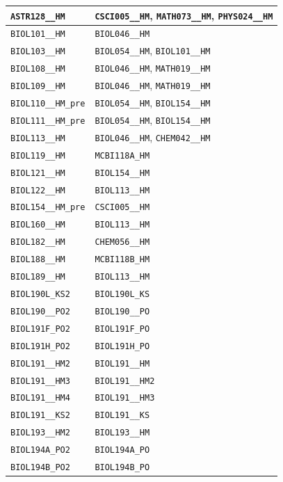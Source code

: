 \begin{longtable}{|p{4.4in}|p{4.4in}|}
    \verb|ASTR128__HM| & \verb|CSCI005__HM|, \verb|MATH073__HM|, \verb|PHYS024__HM|\\\hline
    \verb|BIOL101__HM| & \verb|BIOL046__HM|\\\hline
    \verb|BIOL103__HM| & \verb|BIOL054__HM|, \verb|BIOL101__HM|\\\hline
    \verb|BIOL108__HM| & \verb|BIOL046__HM|, \verb|MATH019__HM|\\\hline
    \verb|BIOL109__HM| & \verb|BIOL046__HM|, \verb|MATH019__HM|\\\hline
    \verb|BIOL110__HM_pre| & \verb|BIOL054__HM|, \verb|BIOL154__HM|\\\hline
    \verb|BIOL111__HM_pre| & \verb|BIOL054__HM|, \verb|BIOL154__HM|\\\hline
    \verb|BIOL113__HM| & \verb|BIOL046__HM|, \verb|CHEM042__HM|\\\hline
    \verb|BIOL119__HM| & \verb|MCBI118A_HM|\\\hline
    \verb|BIOL121__HM| & \verb|BIOL154__HM|\\\hline
    \verb|BIOL122__HM| & \verb|BIOL113__HM|\\\hline
    \verb|BIOL154__HM_pre| & \verb|CSCI005__HM|\\\hline
    \verb|BIOL160__HM| & \verb|BIOL113__HM|\\\hline
    \verb|BIOL182__HM| & \verb|CHEM056__HM|\\\hline
    \verb|BIOL188__HM| & \verb|MCBI118B_HM|\\\hline
    \verb|BIOL189__HM| & \verb|BIOL113__HM|\\\hline
    \verb|BIOL190L_KS2| & \verb|BIOL190L_KS|\\\hline
    \verb|BIOL190__PO2| & \verb|BIOL190__PO|\\\hline
    \verb|BIOL191F_PO2| & \verb|BIOL191F_PO|\\\hline
    \verb|BIOL191H_PO2| & \verb|BIOL191H_PO|\\\hline
    \verb|BIOL191__HM2| & \verb|BIOL191__HM|\\\hline
    \verb|BIOL191__HM3| & \verb|BIOL191__HM2|\\\hline
    \verb|BIOL191__HM4| & \verb|BIOL191__HM3|\\\hline
    \verb|BIOL191__KS2| & \verb|BIOL191__KS|\\\hline
    \verb|BIOL193__HM2| & \verb|BIOL193__HM|\\\hline
    \verb|BIOL194A_PO2| & \verb|BIOL194A_PO|\\\hline
    \verb|BIOL194B_PO2| & \verb|BIOL194B_PO|\\\hline

\end{longtable}

